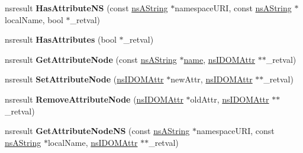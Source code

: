 \begin{DoxyCompactItemize}
\item 
\mbox{\label{interfacens_i_d_o_m_element_a815112bf905096020ddf31e10fe1098f}} 
nsresult {\bfseries Has\+Attribute\+NS} (const \hyperlink{structns_string_container}{ns\+A\+String} $\ast$namespace\+U\+RI, const \hyperlink{structns_string_container}{ns\+A\+String} $\ast$local\+Name, bool $\ast$\+\_\+retval)
\item 
\mbox{\label{interfacens_i_d_o_m_element_a03f3690abb136b4e92fb3fdaf8a8d314}} 
nsresult {\bfseries Has\+Attributes} (bool $\ast$\+\_\+retval)
\item 
\mbox{\label{interfacens_i_d_o_m_element_a42a3550ad1c7a865536fd09bdbb536ce}} 
nsresult {\bfseries Get\+Attribute\+Node} (const \hyperlink{structns_string_container}{ns\+A\+String} $\ast$\hyperlink{structname}{name}, \hyperlink{interfacens_i_d_o_m_attr}{ns\+I\+D\+O\+M\+Attr} $\ast$$\ast$\+\_\+retval)
\item 
\mbox{\label{interfacens_i_d_o_m_element_a29cfd54c2a17c4286ca78d22c979dde6}} 
nsresult {\bfseries Set\+Attribute\+Node} (\hyperlink{interfacens_i_d_o_m_attr}{ns\+I\+D\+O\+M\+Attr} $\ast$new\+Attr, \hyperlink{interfacens_i_d_o_m_attr}{ns\+I\+D\+O\+M\+Attr} $\ast$$\ast$\+\_\+retval)
\item 
\mbox{\label{interfacens_i_d_o_m_element_a52332d92fc4ae45edf1b2ead32cb72a5}} 
nsresult {\bfseries Remove\+Attribute\+Node} (\hyperlink{interfacens_i_d_o_m_attr}{ns\+I\+D\+O\+M\+Attr} $\ast$old\+Attr, \hyperlink{interfacens_i_d_o_m_attr}{ns\+I\+D\+O\+M\+Attr} $\ast$$\ast$\+\_\+retval)
\item 
\mbox{\label{interfacens_i_d_o_m_element_a5d46809a75a7988b81c985fbb0991842}} 
nsresult {\bfseries Get\+Attribute\+Node\+NS} (const \hyperlink{structns_string_container}{ns\+A\+String} $\ast$namespace\+U\+RI, const \hyperlink{structns_string_container}{ns\+A\+String} $\ast$local\+Name, \hyperlink{interfacens_i_d_o_m_attr}{ns\+I\+D\+O\+M\+Attr} $\ast$$\ast$\+\_\+retval)
\item 
\mbox{\label{interfacens_i_d_o_m_element_a7faae155ac3be900515058d6c351f3aa}} 

\end{DoxyCompactItemize}
